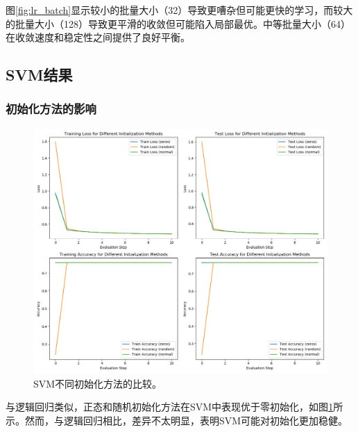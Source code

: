 \documentclass[journal, a4paper]{IEEEtran}
\begin{document}
\begin{CJK}{UTF8}{gbsn}
图\ref{fig:lr_batch}显示较小的批量大小（32）导致更嘈杂但可能更快的学习，而较大的批量大小（128）导致更平滑的收敛但可能陷入局部最优。中等批量大小（64）在收敛速度和稳定性之间提供了良好平衡。

\subsection{SVM结果}

\subsubsection{初始化方法的影响}
\begin{figure}[htbp]
\centering
\includegraphics[width=\linewidth]{svm_init_methods.png}
\caption{SVM不同初始化方法的比较。}
\label{fig:svm_init}
\end{figure}

与逻辑回归类似，正态和随机初始化方法在SVM中表现优于零初始化，如图\ref{fig:svm_init}所示。然而，与逻辑回归相比，差异不太明显，表明SVM可能对初始化更加稳健。


\end{CJK}
\end{document}

